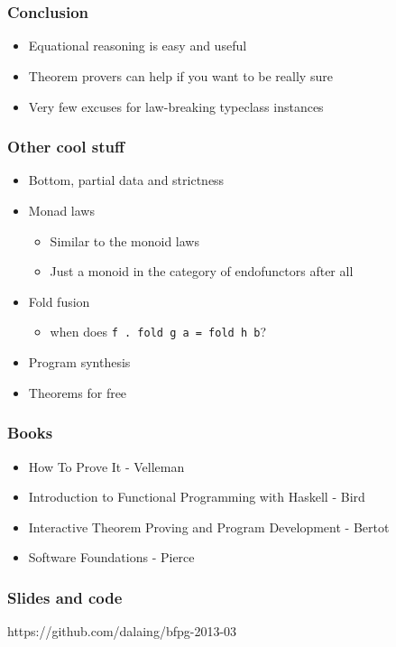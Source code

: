 \documentclass{beamer}
\begin{document}
\section*{}

\begin{frame}
    \frametitle{Conclusion}
\begin{itemize}
\item Equational reasoning is easy and useful
\item Theorem provers can help if you want to be really sure
\item Very few excuses for law-breaking typeclass instances
\end{itemize}
\end{frame}

\begin{frame}
    \frametitle{Other cool stuff}
\begin{itemize}
\item Bottom, partial data and strictness
\item Monad laws
\begin{itemize}
    \item Similar to the monoid laws
    \item Just a monoid in the category of endofunctors after all
\end{itemize}
\item Fold fusion
\begin{itemize}
    \item when does \Verb?f . fold g a = fold h b??
\end{itemize}
\item Program synthesis
\item Theorems for free
\end{itemize}
\end{frame}

\begin{frame}
    \frametitle{Books}
\begin{itemize}
\item How To Prove It - Velleman
\item Introduction to Functional Programming with Haskell - Bird
\item Interactive Theorem Proving and Program Development - Bertot
\item Software Foundations - Pierce
\end{itemize}
\end{frame}

\begin{frame}
    \frametitle{Slides and code}
https://github.com/dalaing/bfpg-2013-03
\end{frame}
\end{document}
